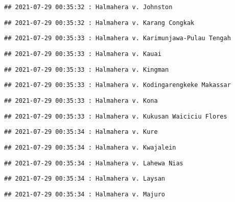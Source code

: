 \documentclass[
]{article}
\begin{document}
\begin{verbatim}
## 2021-07-29 00:35:32 : Halmahera v. Johnston
\end{verbatim}

\begin{verbatim}
## 2021-07-29 00:35:32 : Halmahera v. Karang Congkak
\end{verbatim}

\begin{verbatim}
## 2021-07-29 00:35:33 : Halmahera v. Karimunjawa-Pulau Tengah
\end{verbatim}

\begin{verbatim}
## 2021-07-29 00:35:33 : Halmahera v. Kauai
\end{verbatim}

\begin{verbatim}
## 2021-07-29 00:35:33 : Halmahera v. Kingman
\end{verbatim}

\begin{verbatim}
## 2021-07-29 00:35:33 : Halmahera v. Kodingarengkeke Makassar
\end{verbatim}

\begin{verbatim}
## 2021-07-29 00:35:33 : Halmahera v. Kona
\end{verbatim}

\begin{verbatim}
## 2021-07-29 00:35:33 : Halmahera v. Kukusan Waiciciu Flores
\end{verbatim}

\begin{verbatim}
## 2021-07-29 00:35:34 : Halmahera v. Kure
\end{verbatim}

\begin{verbatim}
## 2021-07-29 00:35:34 : Halmahera v. Kwajalein
\end{verbatim}

\begin{verbatim}
## 2021-07-29 00:35:34 : Halmahera v. Lahewa Nias
\end{verbatim}

\begin{verbatim}
## 2021-07-29 00:35:34 : Halmahera v. Laysan
\end{verbatim}

\begin{verbatim}
## 2021-07-29 00:35:34 : Halmahera v. Majuro
\end{verbatim}
\end{document}
